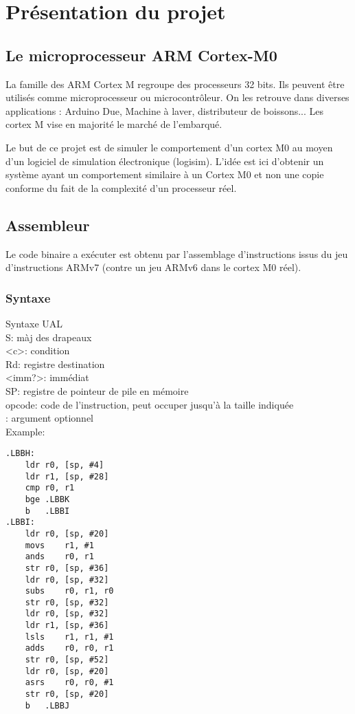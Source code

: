 \section{Présentation du projet}
\subsection{Le microprocesseur ARM Cortex-M0}
	La famille des ARM Cortex M regroupe des processeurs 32 bits. Ils peuvent être utilisés comme microprocesseur ou microcontrôleur. On les retrouve dans diverses applications : Arduino Due,  Machine à laver, distributeur de boissons...  Les cortex M vise en majorité le marché de l'embarqué.

	Le but de ce projet est de simuler le comportement d'un cortex M0 au moyen d'un logiciel de simulation électronique (logisim). L'idée est ici d'obtenir un système ayant un comportement similaire à un Cortex M0 et non une copie conforme du fait de la complexité d'un processeur réel.

\subsection{Assembleur}

	Le code binaire a exécuter est obtenu par l'assemblage d'instructions issus du jeu d'instructions ARMv7 (contre un jeu ARMv6 dans le cortex M0 réel).

\subsubsection{Syntaxe}
Syntaxe UAL\\
S: màj des drapeaux\\
<c>: condition\\
Rd: registre destination\\
<imm?>: immédiat\\
SP: registre de pointeur de pile en mémoire\\
opcode: code de l'instruction, peut occuper jusqu'à la taille indiquée\\
\[\]: argument optionnel\\

Example:
\begin{lstlisting}
.LBBH:                                
	ldr	r0, [sp, #4]
	ldr	r1, [sp, #28]
	cmp	r0, r1
	bge	.LBBK
	b	.LBBI
.LBBI:                                
	ldr	r0, [sp, #20]
	movs	r1, #1
	ands	r0, r1
	str	r0, [sp, #36]
	ldr	r0, [sp, #32]
	subs	r0, r1, r0
	str	r0, [sp, #32]
	ldr	r0, [sp, #32]
	ldr	r1, [sp, #36]
	lsls	r1, r1, #1
	adds	r0, r0, r1
	str	r0, [sp, #52]
	ldr	r0, [sp, #20]
	asrs	r0, r0, #1
	str	r0, [sp, #20]
	b	.LBBJ
\end{lstlisting}
